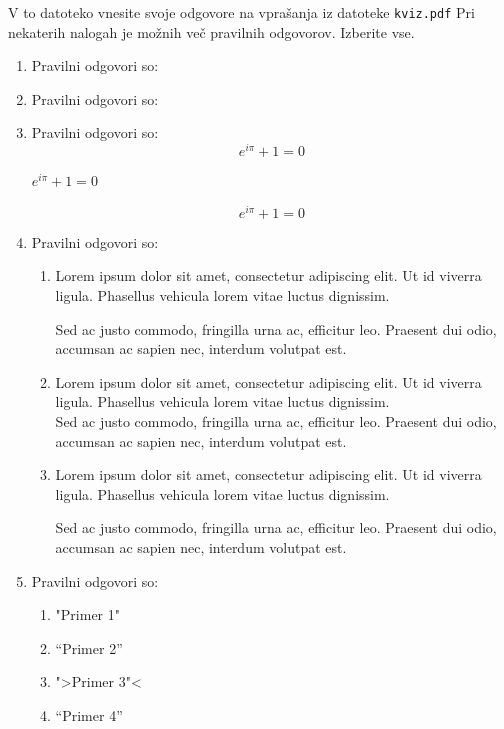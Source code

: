 \documentclass[11pt]{article}
\begin{document}
V to datoteko vnesite svoje odgovore na vprašanja iz datoteke \texttt{kviz.pdf}
Pri nekaterih nalogah je možnih več pravilnih odgovorov. Izberite vse.

\begin{enumerate}
    \item Pravilni odgovori so: %
    
    \item Pravilni odgovori so: %
    
    \item Pravilni odgovori so:  %
      \[ e^{i \pi} + 1 = 0 \]
      \begin{center}
          \( e^{i \pi} + 1 = 0 \)
      \end{center}
      \begin{equation*}
          e^{i \pi} + 1 = 0
      \end{equation*}

    \item Pravilni odgovori so: %
        \begin{enumerate}
            \item {
Lorem ipsum dolor sit amet, consectetur adipiscing 
elit. Ut id viverra ligula. Phasellus vehicula lorem 
vitae luctus dignissim. 
                
Sed ac justo commodo, fringilla urna ac, efficitur 
leo. Praesent dui odio, accumsan ac sapien nec, 
interdum volutpat est. 
            }
            \item {
Lorem ipsum dolor sit amet, consectetur adipiscing 
elit. Ut id viverra ligula. Phasellus vehicula lorem 
vitae luctus dignissim. \\
Sed ac justo commodo, fringilla urna ac, efficitur 
leo. Praesent dui odio, accumsan ac sapien nec, 
interdum volutpat est.             }
            \item {
Lorem ipsum dolor sit amet, consectetur adipiscing 
elit. Ut id viverra ligula. Phasellus vehicula lorem 
vitae luctus dignissim. \par
Sed ac justo commodo, fringilla urna ac, efficitur 
leo. Praesent dui odio, accumsan ac sapien nec, 
interdum volutpat est.             }
        \end{enumerate}
    
      \item Pravilni odgovori so: %
        \begin{enumerate}
          \item "Primer 1"
          \item ``Primer 2''
          \item ">Primer 3"<
          \item "`Primer 4"'
        \end{enumerate}


\end{enumerate}
\end{document}

